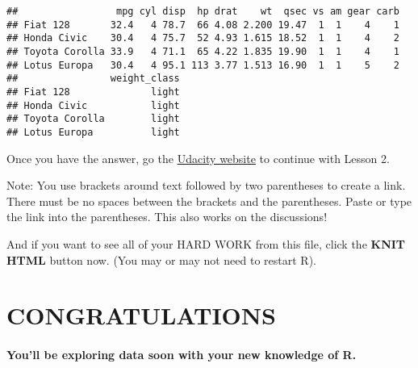 \documentclass[]{article}
\let\oldparagraph\paragraph
\renewcommand{\paragraph}[1]{\oldparagraph{#1}\mbox{}}
\begin{document}
\begin{verbatim}
##                 mpg cyl disp  hp drat    wt  qsec vs am gear carb
## Fiat 128       32.4   4 78.7  66 4.08 2.200 19.47  1  1    4    1
## Honda Civic    30.4   4 75.7  52 4.93 1.615 18.52  1  1    4    2
## Toyota Corolla 33.9   4 71.1  65 4.22 1.835 19.90  1  1    4    1
## Lotus Europa   30.4   4 95.1 113 3.77 1.513 16.90  1  1    5    2
##                weight_class
## Fiat 128              light
## Honda Civic           light
## Toyota Corolla        light
## Lotus Europa          light
\end{verbatim}

Once you have the answer, go the
\href{https://www.udacity.com/course/viewer\#!/c-ud651/l-729069797/e-804129319/m-811719066}{Udacity
website} to continue with Lesson 2.

Note: You use brackets around text followed by two parentheses to create
a link. There must be no spaces between the brackets and the
parentheses. Paste or type the link into the parentheses. This also
works on the discussions!

And if you want to see all of your HARD WORK from this file, click the
\textbf{KNIT HTML} button now. (You may or may not need to restart R).

\section{CONGRATULATIONS}\label{congratulations}

\paragraph{You'll be exploring data soon with your new knowledge of
R.}\label{youll-be-exploring-data-soon-with-your-new-knowledge-of-r.}
\end{document}
